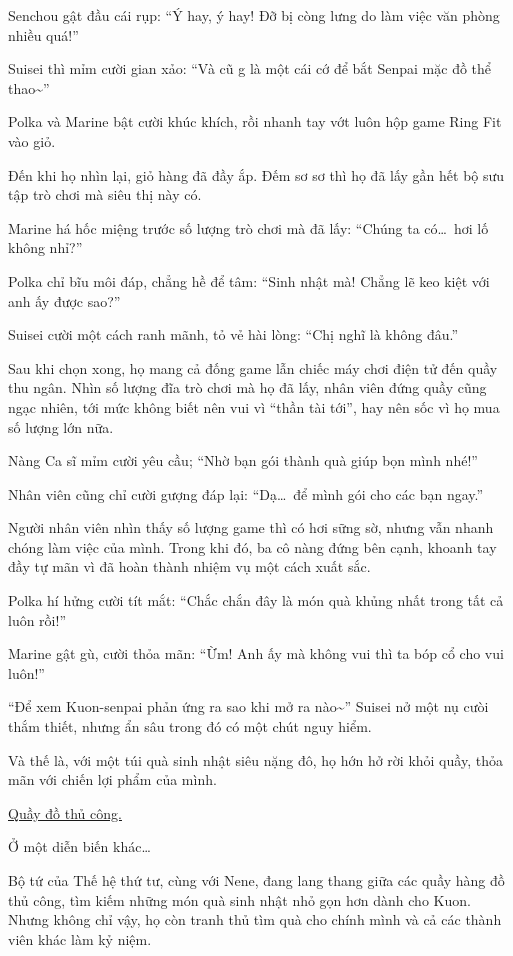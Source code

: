 \documentclass[../main.tex]{subfiles}
\begin{document}
Senchou gật đầu cái rụp: ``Ý hay, ý hay! Đỡ bị còng lưng do làm việc văn phòng nhiều quá!''

Suisei thì mỉm cười gian xảo: ``Và cũ g là một cái cớ để bắt Senpai mặc đồ thể thao\~{}''

Polka và Marine bật cười khúc khích, rồi nhanh tay vớt luôn hộp game Ring Fit vào giỏ.

Đến khi họ nhìn lại, giỏ hàng đã đầy ắp. Đếm sơ sơ thì họ đã lấy gần hết bộ sưu tập trò chơi mà siêu thị này có.

Marine há hốc miệng trước số lượng trò chơi mà đã lấy: ``Chúng ta có\dots\ hơi lố không nhỉ?''

Polka chỉ bĩu môi đáp, chẳng hề để tâm: ``Sinh nhật mà! Chẳng lẽ keo kiệt với anh ấy được sao?''

Suisei cười một cách ranh mãnh, tỏ vẻ hài lòng: ``Chị nghĩ là không đâu.''

Sau khi chọn xong, họ mang cả đống game lẫn chiếc máy chơi điện tử đến quầy thu ngân. Nhìn số lượng đĩa trò chơi mà họ đã lấy, nhân viên đứng quầy cũng ngạc nhiên, tới mức không biết nên vui vì ``thần tài tới'', hay nên sốc vì họ mua số lượng lớn nữa.

Nàng Ca sĩ mỉm cười yêu cầu; ``Nhờ bạn gói thành quà giúp bọn mình nhé!''

Nhân viên cũng chỉ cười gượng đáp lại: ``Dạ\dots\ để mình gói cho các bạn ngay.''

Người nhân viên nhìn thấy số lượng game thì có hơi sững sờ, nhưng vẫn nhanh chóng làm việc của mình. Trong khi đó, ba cô nàng đứng bên cạnh, khoanh tay đầy tự mãn vì đã hoàn thành nhiệm vụ một cách xuất sắc.

Polka hí hửng cười tít mắt: ``Chắc chắn đây là món quà khủng nhất trong tất cả luôn rồi!''

Marine gật gù, cười thỏa mãn: ``Ừm! Anh ấy mà không vui thì ta bóp cổ cho vui luôn!''

``Để xem Kuon-senpai phản ứng ra sao  khi mở ra nào\~{}'' Suisei nở một nụ cưòi thắm thiết, nhưng ẩn sâu trong đó có một chút nguy hiểm.

Và thế là, với một túi quà sinh nhật siêu nặng đô, họ hớn hở rời khỏi quầy, thỏa mãn với chiến lợi phẩm của mình.

\begin{center}
    \uline{Quầy đồ thủ công.}
\end{center}

Ở một diễn biến khác\dots

Bộ tứ của Thế hệ thứ tư, cùng với Nene, đang lang thang giữa các quầy hàng đồ thủ công, tìm kiếm những món quà sinh nhật nhỏ gọn hơn dành cho Kuon. Nhưng không chỉ vậy, họ còn tranh thủ tìm quà cho chính mình và cả các thành viên khác làm kỷ niệm.
\end{document}
